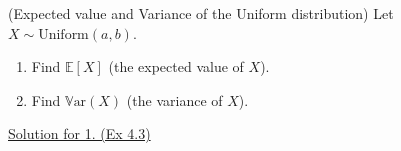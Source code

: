 \begin{problem} (Expected value and Variance of the Uniform distribution)
Let \( X \sim \text{Uniform}(a, b) \). 

\begin{enumerate}
    \item Find \( \mathbb{E}[X] \) (the expected value of \( X \)).
    \item Find \( \mathbb{V}\text{ar}(X) \) (the variance of \( X \)).
\end{enumerate}

\href{https://www.probabilitycourse.com/chapter4/4_1_2_expected_val_variance.php}{Solution for 1. (Ex 4.3)}
\end{problem}

    

